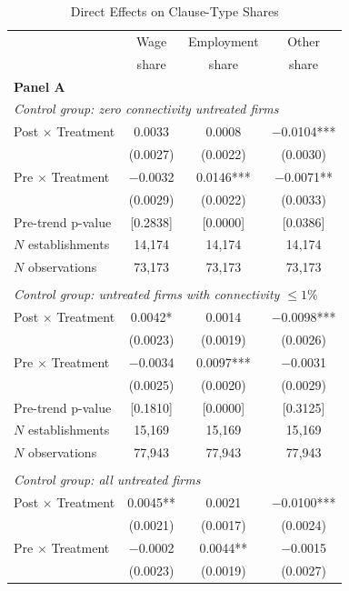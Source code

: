 \begin{table}[!htbp]
\centering
\caption{Direct Effects on Clause-Type Shares}
\label{tab:clause_prop_direct}
\scriptsize
\begin{tabular}{lccc}
\toprule
 & Wage & Employment & Other \\
 & share & share & share \\
\midrule
\multicolumn{4}{l}{\textbf{Panel A}}\\
\multicolumn{4}{l}{\textit{Control group: zero connectivity untreated firms}}\\
Post $\times$ Treatment & 0.0033 & 0.0008 & $-$0.0104***\\
 & (0.0027) & (0.0022) & (0.0030)\\
Pre $\times$ Treatment & $-$0.0032 & 0.0146*** & $-$0.0071**\\
 & (0.0029) & (0.0022) & (0.0033)\\
Pre-trend p-value & [0.2838] & [0.0000] & [0.0386]\\
$N$ establishments & 14{,}174 & 14{,}174 & 14{,}174\\
$N$ observations & 73{,}173 & 73{,}173 & 73{,}173\\
\addlinespace
\multicolumn{4}{l}{\textbf{Panel B}}\\
\multicolumn{4}{l}{\textit{Control group: untreated firms with connectivity $\leq 1\%$}}\\
Post $\times$ Treatment & 0.0042* & 0.0014 & $-$0.0098***\\
 & (0.0023) & (0.0019) & (0.0026)\\
Pre $\times$ Treatment & $-$0.0034 & 0.0097*** & $-$0.0031\\
 & (0.0025) & (0.0020) & (0.0029)\\
Pre-trend p-value & [0.1810] & [0.0000] & [0.3125]\\
$N$ establishments & 15{,}169 & 15{,}169 & 15{,}169\\
$N$ observations & 77{,}943 & 77{,}943 & 77{,}943\\
\addlinespace
\multicolumn{4}{l}{\textbf{Panel C}}\\
\multicolumn{4}{l}{\textit{Control group: all untreated firms}}\\
Post $\times$ Treatment & 0.0045** & 0.0021 & $-$0.0100***\\
 & (0.0021) & (0.0017) & (0.0024)\\
Pre $\times$ Treatment & $-$0.0002 & 0.0044** & $-$0.0015\\
 & (0.0023) & (0.0019) & (0.0027)\\

\end{tabular}
\end{table}
